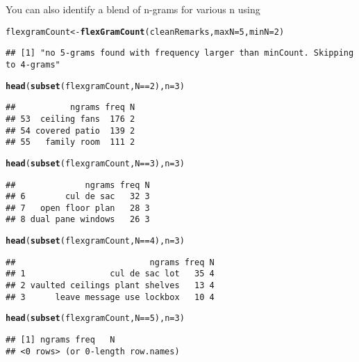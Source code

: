 \documentclass{article}\usepackage[]{graphicx}\usepackage[]{color}
\makeatletter
\newcommand{\hlnum}[1]{\textcolor[rgb]{0.686,0.059,0.569}{#1}}%
\newcommand{\hlopt}[1]{\textcolor[rgb]{0,0,0}{#1}}%
\newcommand{\hlstd}[1]{\textcolor[rgb]{0.345,0.345,0.345}{#1}}%
\newcommand{\hlkwb}[1]{\textcolor[rgb]{0.69,0.353,0.396}{#1}}%
\newcommand{\hlkwc}[1]{\textcolor[rgb]{0.333,0.667,0.333}{#1}}%
\newcommand{\hlkwd}[1]{\textcolor[rgb]{0.737,0.353,0.396}{\textbf{#1}}}%
\newenvironment{kframe}{%
 \def\at@end@of@kframe{}%
 \ifinner\ifhmode%
  \def\at@end@of@kframe{\end{minipage}}%
  \begin{minipage}{\columnwidth}%
 \fi\fi%
 \def\FrameCommand##1{\hskip\@totalleftmargin \hskip-\fboxsep
 \colorbox{shadecolor}{##1}\hskip-\fboxsep
     \hskip-\linewidth \hskip-\@totalleftmargin \hskip\columnwidth}%
 \MakeFramed {\advance\hsize-\width
   \@totalleftmargin\z@ \linewidth\hsize
   \@setminipage}}%
 {\par\unskip\endMakeFramed%
 \at@end@of@kframe}
\newenvironment{knitrout}{}{} %
\makeatother
\begin{document}
You can also identify a blend of n-grams for various n using
\begin{knitrout}\footnotesize
{}\color{fgcolor}\begin{kframe}
\begin{alltt}
\hlstd{flexgramCount} \hlkwb{<-} \hlkwd{flexGramCount}\hlstd{(cleanRemarks ,} \hlkwc{maxN}\hlstd{=}\hlnum{5} \hlstd{,} \hlkwc{minN}\hlstd{=}\hlnum{2}\hlstd{)}
\end{alltt}
\begin{verbatim}
## [1] "no 5-grams found with frequency larger than minCount. Skipping to 4-grams"
\end{verbatim}
\begin{alltt}
\hlkwd{head}\hlstd{(}\hlkwd{subset}\hlstd{(flexgramCount , N}\hlopt{==}\hlnum{2}\hlstd{) ,} \hlkwc{n}\hlstd{=}\hlnum{3}\hlstd{)}
\end{alltt}
\begin{verbatim}
##           ngrams freq N
## 53  ceiling fans  176 2
## 54 covered patio  139 2
## 55   family room  111 2
\end{verbatim}
\begin{alltt}
\hlkwd{head}\hlstd{(}\hlkwd{subset}\hlstd{(flexgramCount , N}\hlopt{==}\hlnum{3}\hlstd{) ,} \hlkwc{n}\hlstd{=}\hlnum{3}\hlstd{)}
\end{alltt}
\begin{verbatim}
##              ngrams freq N
## 6        cul de sac   32 3
## 7   open floor plan   28 3
## 8 dual pane windows   26 3
\end{verbatim}
\begin{alltt}
\hlkwd{head}\hlstd{(}\hlkwd{subset}\hlstd{(flexgramCount , N}\hlopt{==}\hlnum{4}\hlstd{) ,} \hlkwc{n}\hlstd{=}\hlnum{3}\hlstd{)}
\end{alltt}
\begin{verbatim}
##                           ngrams freq N
## 1                 cul de sac lot   35 4
## 2 vaulted ceilings plant shelves   13 4
## 3      leave message use lockbox   10 4
\end{verbatim}
\begin{alltt}
\hlkwd{head}\hlstd{(}\hlkwd{subset}\hlstd{(flexgramCount , N}\hlopt{==}\hlnum{5}\hlstd{) ,} \hlkwc{n}\hlstd{=}\hlnum{3}\hlstd{)}
\end{alltt}
\begin{verbatim}
## [1] ngrams freq   N     
## <0 rows> (or 0-length row.names)
\end{verbatim}
\end{kframe}
\end{knitrout}
\end{document}
